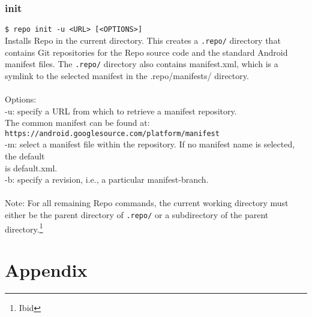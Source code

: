 \documentclass[12pt,letterpaper,dvips]{article}
\newcommand{\cmd}[1]{\texttt{#1}}
\begin{document}
\subsubsection{init}
\cmd{\$ repo init -u <URL> [<OPTIONS>]}
\\
Installs Repo in the current directory. This creates a \cmd{.repo/}
directory that contains Git repositories for the Repo source code
and the standard Android manifest files.  The \cmd{.repo/}
directory also contains manifest.xml, which is a symlink to the
selected manifest in the .repo/manifests/ directory.
\\
\\
Options:
\\
-u: specify a URL from which to retrieve a manifest repository.\\
\indent The common manifest can be found at:\\
\indent \cmd{https://android.googlesource.com/platform/manifest}\\
-m: select a manifest file within the repository. If no manifest
 name is selected, the default\\
 \indent is default.xml.\\
-b: specify a revision, i.e., a particular manifest-branch.\\
\\
Note: For all remaining Repo commands, the current working
directory must either be the parent directory of \cmd{.repo/}
or a subdirectory of the parent directory.\footnote{Ibid}


\newpage
\setcounter{secnumdepth}{0}
\section{Appendix}
\end{document}
